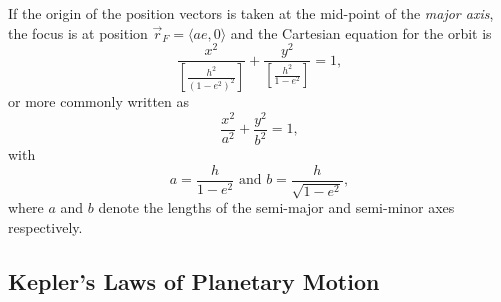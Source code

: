 If the origin of the position vectors is taken at the mid-point of the \textit{major axis}, the focus is at position $\vec{r}_F = \langle ae, 0 \rangle$ and the Cartesian equation for the orbit is
\begin{equation}
    \frac{x^2}{\left[\frac{h^2}{(1-e^2)^2}\right]} + \frac{y^2}{\left[\frac{h^2}{1-e^2}\right]} = 1,
\end{equation}
or more commonly written as
\begin{equation}
    \frac{x^2}{a^2} + \frac{y^2}{b^2} = 1,
\end{equation}
with
\begin{equation}
    a = \frac{h}{1 - e^2} \text{ and } b = \frac{h}{\sqrt{1-e^2}},
\end{equation}
where $a$ and $b$ denote the lengths of the semi-major and semi-minor axes respectively. 

\subsection{Kepler's Laws of Planetary Motion}

